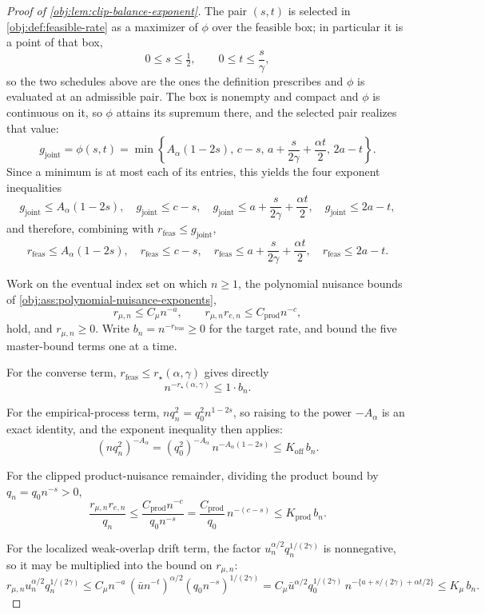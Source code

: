 \begin{proof}[Proof of \cref{obj:lem:clip-balance-exponent}]
The pair \((s,t)\) is selected in \cref{obj:def:feasible-rate} as a maximizer of \(\phi\) over the feasible box; in particular it is a point of that box,
\[
0\le s\le\tfrac12,
\qquad
0\le t\le\frac{s}{\gamma},
\]
so the two schedules above are the ones the definition prescribes and \(\phi\) is evaluated at an admissible pair. %
The box is nonempty and compact and \(\phi\) is continuous on it, so \(\phi\) attains its supremum there, and the selected pair realizes that value:
\[
g_{\mathrm{joint}}=\phi(s,t)
=
\min\left\{
A_\alpha(1-2s),\,
c-s,\,
a+\frac{s}{2\gamma}+\frac{\alpha t}{2},\,
2a-t
\right\}.
\]
Since a minimum is at most each of its entries, this yields the four exponent inequalities
\[
g_{\mathrm{joint}}\le A_\alpha(1-2s),\quad
g_{\mathrm{joint}}\le c-s,\quad
g_{\mathrm{joint}}\le a+\frac{s}{2\gamma}+\frac{\alpha t}{2},\quad
g_{\mathrm{joint}}\le 2a-t,
\]
and therefore, combining with \(r_{\mathrm{feas}}\le g_{\mathrm{joint}}\),
\[
r_{\mathrm{feas}}\le A_\alpha(1-2s),\quad
r_{\mathrm{feas}}\le c-s,\quad
r_{\mathrm{feas}}\le a+\frac{s}{2\gamma}+\frac{\alpha t}{2},\quad
r_{\mathrm{feas}}\le 2a-t .
\]

Work on the eventual index set on which \(n\ge1\), the polynomial nuisance bounds of \cref{obj:ass:polynomial-nuisance-exponents},
\[
r_{\mu,n}\le C_\mu n^{-a},
\qquad
r_{\mu,n}r_{e,n}\le C_{\mathrm{prod}}n^{-c},
\]
hold, and \(r_{\mu,n}\ge0\).  Write \(b_n=n^{-r_{\mathrm{feas}}}\ge0\) for the target rate, and bound the five master-bound terms one at a time.

For the converse term, \(r_{\mathrm{feas}}\le r_\star(\alpha,\gamma)\) gives directly
\[
n^{-r_\star(\alpha,\gamma)}\le 1\cdot b_n .
\]

For the empirical-process term, \(nq_n^2=q_0^2n^{1-2s}\), so raising to the power \(-A_\alpha\) is an exact identity, and the exponent inequality then applies:
\[
(nq_n^2)^{-A_\alpha}
=
(q_0^2)^{-A_\alpha}\,n^{-A_\alpha(1-2s)}
\le
K_{\mathrm{off}}\,b_n .
\]

For the clipped product-nuisance remainder, dividing the product bound by \(q_n=q_0n^{-s}>0\),
\[
\frac{r_{\mu,n}r_{e,n}}{q_n}
\le
\frac{C_{\mathrm{prod}}n^{-c}}{q_0n^{-s}}
=
\frac{C_{\mathrm{prod}}}{q_0}\,n^{-(c-s)}
\le
K_{\mathrm{prod}}\,b_n .
\]

For the localized weak-overlap drift term, the factor \(u_n^{\alpha/2}q_n^{1/(2\gamma)}\) is nonnegative, so it may be multiplied into the bound on \(r_{\mu,n}\):
\[
r_{\mu,n}u_n^{\alpha/2}q_n^{1/(2\gamma)}
\le
C_\mu n^{-a}\,(\bar u n^{-t})^{\alpha/2}(q_0n^{-s})^{1/(2\gamma)}
=
C_\mu\bar u^{\alpha/2}q_0^{1/(2\gamma)}\,
n^{-\{a+s/(2\gamma)+\alpha t/2\}}
\le
K_\mu\,b_n .
\]


\end{proof}
